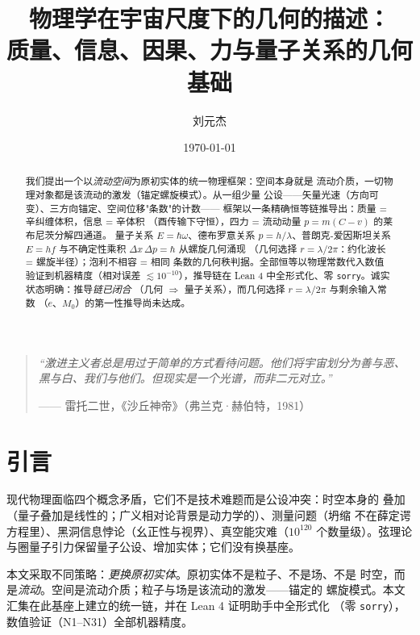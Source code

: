 \documentclass[aps,prd,preprint,superscriptaddress,amsmath,amssymb]{revtex4-2}
\begin{document}
\title{物理学在宇宙尺度下的几何的描述：\\ 质量、信息、因果、力与量子关系的几何基础}

\author{刘元杰}

\date{\today}

\begin{abstract}
我们提出一个以\emph{流动空间}为原初实体的统一物理框架：空间本身就是
流动介质，一切物理对象都是该流动的激发（锚定螺旋模式）。从一组少量
公设——矢量光速（方向可变）、三方向锚定、空间位移"条数"的计数——
框架以一条精确恒等链推导出：质量 = 辛纠缠体积，信息 = 辛体积
（酉传输下守恒），四力 = 流动动量 $p=m(C-v)$ 的莱布尼茨分解四通道。
量子关系 $E=\hbar\omega$、德布罗意关系 $p=h/\lambda$、普朗克-爱因斯坦关系
$E=hf$ 与不确定性乘积 $\Delta x\,\Delta p=\hbar$ 从螺旋几何涌现
（几何选择 $r=\lambda/2\pi$：约化波长 = 螺旋半径）；泡利不相容 = 相同
条数的几何秩判据。全部恒等以物理常数代入数值验证到机器精度（相对误差
$\lesssim 10^{-10}$），推导链在 Lean 4 中全形式化、零 \texttt{sorry}。诚实状态明确：推导\emph{链已闭合}
（几何 $\Rightarrow$ 量子关系），而几何选择 $r=\lambda/2\pi$ 与剩余输入常数
（$e$、$M_0$）的第一性推导尚未达成。
\end{abstract}

\maketitle

\begin{quote}
\itshape
``激进主义者总是用过于简单的方式看待问题。他们将宇宙划分为善与恶、黑与白、我们与他们。但现实是一个光谱，而非二元对立。''
\par
\hfill —— 雷托二世，《沙丘神帝》（弗兰克·赫伯特，1981）
\end{quote}

\section{引言}
\label{sec:intro}

现代物理面临四个概念矛盾，它们不是技术难题而是公设冲突：时空本身的
叠加（量子叠加是线性的；广义相对论背景是动力学的）、测量问题（坍缩
不在薛定谔方程里）、黑洞信息悖论（幺正性与视界）、真空能灾难（$10^{120}$
个数量级）。弦理论与圈量子引力保留量子公设、增加实体；它们没有换基座。

本文采取不同策略：\emph{更换原初实体}。原初实体不是粒子、不是场、不是
时空，而是\emph{流动}。空间是流动介质；粒子与场是该流动的激发——锚定的
螺旋模式。本文汇集在此基座上建立的统一链\cite{ProjectionPhysics}，并在 Lean 4 证明助手中全形式化
（零 \texttt{sorry}），数值验证（N1--N31）全部机器精度。
\end{document}
